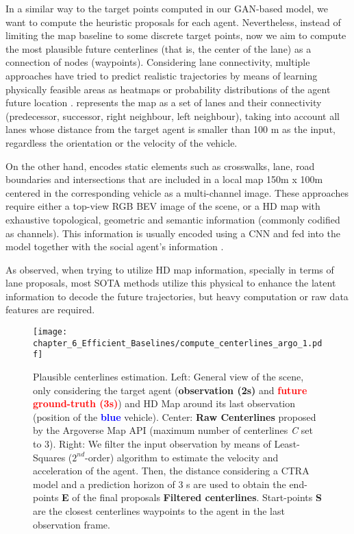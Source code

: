 In a similar way to the target points computed in our \ac{GAN}-based model, we want to compute the heuristic proposals for each agent. Nevertheless, instead of limiting the map baseline to some discrete target points, now we aim to compute the most plausible future centerlines (that is, the center of the lane) as a connection of nodes (waypoints). Considering lane connectivity, multiple approaches have tried to predict realistic trajectories by means of learning physically feasible areas as heatmaps or probability distributions of the agent future location \cite{dendorfer2020goal, sadeghian2019sophie, gilles2021home}. \cite{liang2020learning} represents the map as a set of lanes and their connectivity (predecessor, successor, right neighbour, left neighbour), taking into account all lanes whose distance from the target agent is smaller than 100 m as the input, regardless the orientation or the velocity of the vehicle. 

On the other hand, \cite{djuric2021multixnet} encodes static elements such as crosswalks, lane, road boundaries and intersections that are included in a local map 150m x 100m centered in the corresponding vehicle  as a multi-channel image.  These approaches require either a top-view RGB \ac{BEV} image of the scene, or a HD map with exhaustive topological, geometric and semantic information (commonly codified as channels). This information is usually encoded using a \ac{CNN} and fed into the model together with the social agent's information \cite{dendorfer2020goal, sadeghian2019sophie, gao2020vectornet}. 

As observed, when trying to utilize HD map information, specially in terms of lane proposals, most \ac{SOTA} methods utilize this physical to enhance the latent information to decode the future trajectories, but heavy computation or raw data features are required. 

\begin{figure*}[]
	\centering
	\texttt{[image: chapter\_6\_Efficient\_Baselines/compute\_centerlines\_argo\_1.pdf]}
	\captionsetup{justification=justified}
	\caption[Plausible centerlines estimation in Argoverse 1]{Plausible centerlines estimation. Left: General view of the scene, only considering the target agent (\textbf{\textcolor{YellowOrange}{observation (2s)}} and \textbf{\textcolor{red}{future ground-truth (3s)}}) and HD Map around its last observation (position of the \textbf{\textcolor{blue}{blue}} vehicle). Center: \textbf{Raw Centerlines} proposed by the Argoverse Map \ac{API} (maximum number of centerlines \textit{C} set to 3). Right: We filter the input observation by means of Least-Squares ($2^{nd}$-order) algorithm to estimate the velocity and acceleration of the agent. Then, the distance considering a \ac{CTRA} model and a prediction horizon of 3 s are used to obtain the end-points \textbf{E} of the final proposals \textbf{Filtered centerlines}. Start-points \textbf{S} are the closest centerlines waypoints to the agent in the last observation frame.}
	\label{fig:chapter_6_Efficient_Baselines/efficient_baselines_hdmap_filtering}
\end{figure*}

